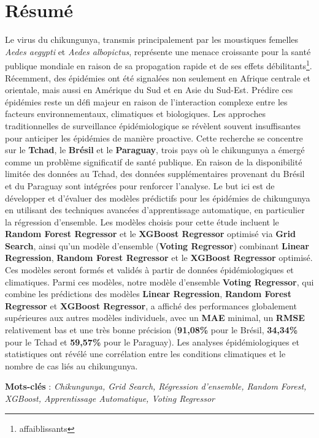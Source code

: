 \chapter*{Résumé}

\renewcommand{\abstractnamefont}{\normalfont\Large\bfseries}

\hskip7mm

\begin{spacing}{1.3}

\end{spacing}

Le virus du chikungunya, transmis principalement par les moustiques femelles \textit{Aedes aegypti} et \textit{Aedes albopictus}, représente une menace croissante pour la santé publique mondiale en raison de sa propagation rapide et de ses effets débilitants\footnote{affaiblissants}. Récemment, des épidémies ont été signalées non seulement en Afrique centrale et orientale, mais aussi en Amérique du Sud et en Asie du Sud-Est. Prédire ces épidémies reste un défi majeur en raison de l'interaction complexe entre les facteurs environnementaux, climatiques et biologiques. Les approches traditionnelles de surveillance épidémiologique se révèlent souvent insuffisantes pour anticiper les épidémies de manière proactive. Cette recherche se concentre sur le \textbf{Tchad}, le \textbf{Brésil} et le \textbf{Paraguay}, trois pays où le chikungunya a émergé comme un problème significatif de santé publique. En raison de la disponibilité limitée des données au Tchad, des données supplémentaires provenant du Brésil et du Paraguay sont intégrées pour renforcer l'analyse. Le but ici est de développer et d'évaluer des modèles prédictifs pour les épidémies de chikungunya en utilisant des techniques avancées d'apprentissage automatique, en particulier la régression d'ensemble. Les modèles choisis pour cette étude incluent le \textbf{Random Forest Regressor} et le \textbf{XGBoost Regressor} optimisé via \textbf{Grid Search}, ainsi qu'un modèle d'ensemble (\textbf{Voting Regressor}) combinant \textbf{Linear Regression}, \textbf{Random Forest Regressor} et le \textbf{XGBoost Regressor} optimisé. Ces modèles seront formés et validés à partir de données épidémiologiques et climatiques. Parmi ces modèles, notre modèle d'ensemble \textbf{Voting Regressor}, qui combine les prédictions des modèles \textbf{Linear Regression}, \textbf{Random Forest Regressor} et \textbf{XGBoost Regressor}, a affiché des performances globalement supérieures aux autres modèles individuels, avec un \textbf{MAE} minimal, un \textbf{RMSE} relativement bas et une très bonne précision (\textbf{91,08\%} pour le Brésil, \textbf{34,34\%} pour le Tchad et \textbf{59,57\%} pour le Paraguay). Les analyses épidémiologiques et statistiques ont révélé une corrélation entre les conditions climatiques et le nombre de cas liés au chikungunya.

\textbf{Mots-clés} : \textit{Chikungunya, Grid Search, Régression d'ensemble, Random Forest, XGBoost, Apprentissage Automatique, Voting Regressor}


